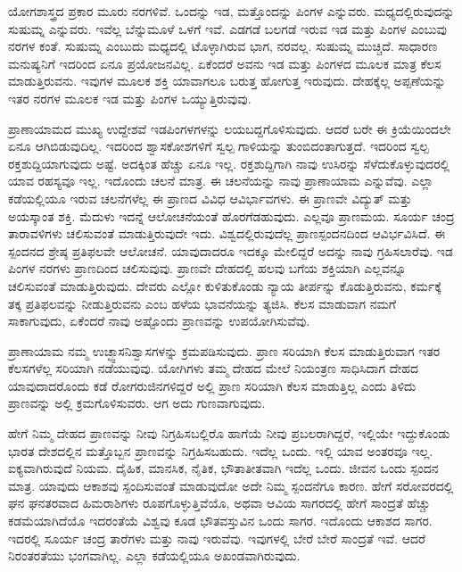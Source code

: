 ಯೋಗಶಾಸ್ತ್ರದ ಪ್ರಕಾರ ಮೂರು ನರಗಳಿವೆ. ಒಂದನ್ನು ಇಡ, ಮತ್ತೊಂದನ್ನು ಪಿಂಗಳ ಎನ್ನುವರು. ಮಧ್ಯದಲ್ಲಿರುವುದನ್ನು ಸುಷುಮ್ನ ಎನ್ನುವರು. ಇವೆಲ್ಲ ಬೆನ್ನುಮೂಳೆ ಒಳಗೆ ಇವೆ. ಎಡಗಡೆ ಬಲಗಡೆ ಇರುವ ಇಡ ಮತ್ತು ಪಿಂಗಳ ಎಂಬುವು ನರಗಳ ಕಂತೆ. ಸುಷುಮ್ನ ಎಂಬುದು ಮಧ್ಯದಲ್ಲಿ ಟೊಳ್ಳಾಗಿರುವ ಭಾಗ, ನರವಲ್ಲ. ಸುಷುಮ್ನ ಮುಚ್ಚಿದೆ. ಸಾಧಾರಣ ಮನುಷ್ಯನಿಗೆ ಇದರಿಂದ ಏನೂ ಪ್ರಯೋಜನವಿಲ್ಲ. ಏಕೆಂದರೆ ಅವನು ಇಡ ಮತ್ತು ಪಿಂಗಳದ ಮೂಲಕ ಮಾತ್ರ ಕೆಲಸ ಮಾಡುತ್ತಿರುವನು. ಇವುಗಳ ಮೂಲಕ ಶಕ್ತಿ ಯಾವಾಗಲೂ ಬರುತ್ತ ಹೋಗುತ್ತ ಇರುವುದು. ದೇಹಕ್ಕೆಲ್ಲ ಅಪ್ಪಣೆಯನ್ನು ಇತರ ನರಗಳ ಮೂಲಕ ಇಡ ಮತ್ತು ಪಿಂಗಳ ಒಯ್ಯುತ್ತಿರುವುವು.

ಪ್ರಾಣಾಯಾಮದ ಮುಖ್ಯ ಉದ್ದೇಶವೆ ಇಡಪಿಂಗಳಗಳನ್ನು ಲಯಬದ್ದಗೊಳಿಸುವುದು. ಆದರೆ ಬರೇ ಈ ಕ್ರಿಯೆಯಿಂದಲೇ ಏನೂ ಆಗಿಬಿಡುವುದಿಲ್ಲ. ಇದರಿಂದ ಶ್ವಾಸಕೋಶಗಳಿಗೆ ಸ್ವಲ್ಪ ಗಾಳಿಯನ್ನು ತುಂಬಿದಂತಾಗುತ್ತದೆ. ಇದರಿಂದ ಸ್ವಲ್ಪ ರಕ್ತ\break ಶುದ್ದಿಯಾಗುವುದು ಅಷ್ಟೆ. ಅದಕ್ಕಿಂತ ಹೆಚ್ಚು ಏನೂ ಇಲ್ಲ. ರಕ್ತಶುದ್ದಿಗಾಗಿ ನಾವು ಉಸಿರನ್ನು ಸೆಳೆದುಕೊಳ್ಳುವುದರಲ್ಲಿ ಯಾವ ರಹಸ್ಯವೂ ಇಲ್ಲ. ಇದೊಂದು ಚಲನೆ ಮಾತ್ರ. ಈ ಚಲನೆಯನ್ನು ನಾವು ಪ್ರಾಣಾಯಾಮ ಎನ್ನುವೆವು. ಎಲ್ಲಾ ಕಡೆಯಲ್ಲಿಯೂ ಇರುವ ಚಲನೆಗಳೆಲ್ಲ ಈ ಪ್ರಾಣದ ವಿವಿಧ ಆವಿರ್ಭಾವಗಳು. ಈ ಪ್ರಾಣವೇ ವಿದ್ಯುತ್ ಮತ್ತು ಅಯಸ್ಕಾಂತ ಶಕ್ತಿ. ಮೆದುಳು ಇದನ್ನೆ ಆಲೋಚನೆಯಂತೆ ಹೊರಗೆಡಹುವುದು. ಎಲ್ಲವೂ ಪ್ರಾಣಮಯ. ಸೂರ್ಯ ಚಂದ್ರ ತಾರಾವಳಿಗಳು ಚಲಿಸುವಂತೆ ಮಾಡುತ್ತಿರುವುದೇ ಇದು. ವಿಶ್ವದಲ್ಲಿರುವುದೆಲ್ಲ ಪ್ರಾಣಸ್ಪಂದನದಿಂದ ಆವಿರ್ಭವಿಸಿದೆ. ಈ ಸ್ಪಂದನದ ಶ್ರೇಷ್ಠ ಪ್ರತಿಫಲವೇ ಆಲೋಚನೆ. ಯಾವುದಾದರೂ ಇದಕ್ಕೂ ಮೇಲಿದ್ದರೆ ಅದನ್ನು ನಾವು ಗ್ರಹಿಸಲಾರೆವು. ಇಡ ಪಿಂಗಳ ನರಗಳು ಪ್ರಾಣದಿಂದ ಚಲಿಸುವುವು. ಪ್ರಾಣವೇ ದೇಹದಲ್ಲಿ ಹಲವು ಬಗೆಯ ಶಕ್ತಿಯಾಗಿ ಎಲ್ಲವನ್ನೂ ಚಲಿಸುವಂತೆ ಮಾಡುತ್ತಿರುವುದು. ದೇವರು ಎಲ್ಲೋ ಕುಳಿತುಕೊಂಡು ನ್ಯಾಯ ತೀರ್ಪನ್ನು ಕೊಡುತ್ತಿರುವನು, ಕರ್ಮಕ್ಕೆ ತಕ್ಕ ಪ್ರತಿಫಲವನ್ನು ನೀಡುತ್ತಿರುವನು ಎಂಬ ಹಳೆಯ ಭಾವನೆಯನ್ನು ತ್ಯಜಿಸಿ. ಕೆಲಸ ಮಾಡುವಾಗ ನಮಗೆ ಸಾಕಾಗುವುದು, ಏಕೆಂದರೆ ನಾವು ಅಷ್ಟೊಂದು ಪ್ರಾಣವನ್ನು ಉಪಯೋಗಿಸುವೆವು.

ಪ್ರಾಣಾಯಾಮ ನಮ್ಮ ಉಚ್ಛ್ವಾಸನಿಶ್ವಾಸಗಳನ್ನು ಕ್ರಮಪಡಿಸುವುದು. ಪ್ರಾಣ ಸರಿಯಾಗಿ ಕೆಲಸ ಮಾಡುತ್ತಿರುವಾಗ ಇತರ ಕೆಲಸಗಳೆಲ್ಲ ಸರಿಯಾಗಿ ನಡೆಯುವುವು. ಯೋಗಿಗಳು ತಮ್ಮ ದೇಹದ ಮೇಲೆ ನಿಯಂತ್ರಣ ಸಾಧಿಸಿದಾಗ ದೇಹದ ಯಾವುದಾದರೊಂದು ಕಡೆ ರೋಗರುಜಿನಗಳಿದ್ದರೆ ಅಲ್ಲಿ ಪ್ರಾಣ ಸರಿಯಾಗಿ ಕೆಲಸ ಮಾಡುತ್ತಿಲ್ಲ ಎಂದು ತಿಳಿದು ಪ್ರಾಣವನ್ನು ಅಲ್ಲಿ ಕ್ರಮಗೊಳಿಸುವರು. ಆಗ ಅದು ಗುಣವಾಗುವುದು.

ಹೇಗೆ ನಿಮ್ಮ ದೇಹದ ಪ್ರಾಣವನ್ನು ನೀವು ನಿಗ್ರಹಿಸಬಲ್ಲಿರೊ ಹಾಗೆಯೆ ನೀವು ಪ್ರಬಲರಾಗಿದ್ದರೆ, ಇಲ್ಲಿಯೇ ಇದ್ದುಕೊಂಡು ಭಾರತ ದೇಶದಲ್ಲಿನ ಮತ್ತೊಬ್ಬನ ಪ್ರಾಣವನ್ನು ನಿಗ್ರಹಿಸಬಹುದು. ಇದೆಲ್ಲ ಒಂದು. ಇಲ್ಲಿ ಯಾವ ಅಂತರವೂ ಇಲ್ಲ. ಐಕ್ಯವಾಗಿರುವುದೆ ನಿಯಮ. ದೈಹಿಕ, ಮಾನಸಿಕ, ನೈತಿಕ, ಭೌತಾತೀತವಾಗಿ ಇದೆಲ್ಲ ಒಂದು. ಜೀವನ ಒಂದು ಸ್ಪಂದನ ಮಾತ್ರ. ಯಾವುದು ಆಕಾಶವು ಸ್ಪಂದಿಸುವಂತೆ ಮಾಡುವುದೋ ಅದೇ ನಿಮ್ಮ ಸ್ಪಂದನೆಗೂ ಕಾರಣ. ಹೇಗೆ ಸರೋವರದಲ್ಲಿ ಘನ ಘನತರವಾದ ಹಿಮರಾಶಿಗಳು ರೂಪಗೊಳ್ಳುತ್ತಿವೆಯೊ, ಅಥವಾ ಆವಿಯ ಸಾಗರದಲ್ಲಿ ಹೇಗೆ ಸಾಂದ್ರತೆ ಹೆಚ್ಚು ಕಡಮೆಯಾಗಿದೆಯೊ ಇದರಂತೆಯೆ ವಿಶ್ವವು ಕೂಡ ಭೌತವಸ್ತುವಿನ ಒಂದು ಸಾಗರ. ಇದೊಂದು ಆಕಾಶದ ಸಾಗರ. ಇದರಲ್ಲಿ ಸೂರ್ಯ ಚಂದ್ರ ತಾರೆಗಳು ಮತ್ತು ನಾವು ಇರುವೆವು. ಇವುಗಳಲ್ಲಿ ಬೇರೆ ಬೇರೆ ಸಾಂದ್ರತೆ ಇವೆ. ಆದರೆ ನಿರಂತರತೆಯು ಭಂಗವಾಗಿಲ್ಲ. ಎಲ್ಲಾ ಕಡೆಯಲ್ಲಿಯೂ ಅಖಂಡವಾಗಿರುವುದು.

